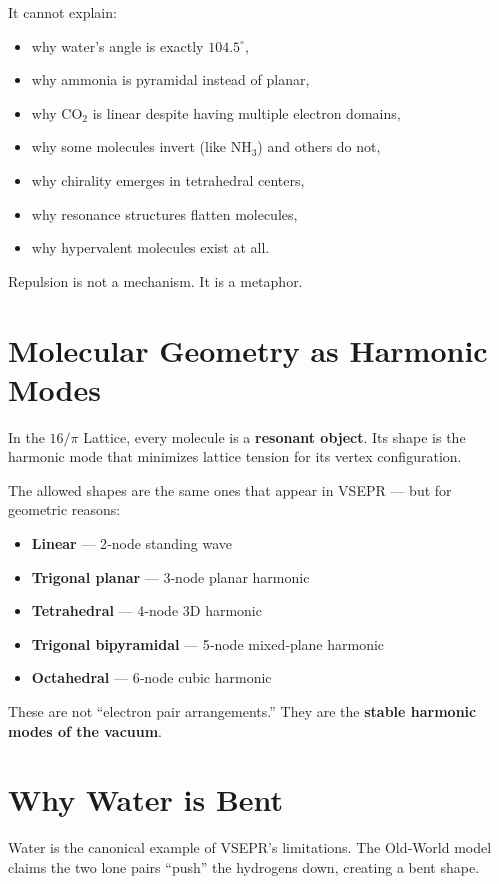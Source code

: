 \documentclass[11pt, letterpaper, openany]{book}
\begin{document}
It cannot explain:

\begin{itemize}
    \item why water’s angle is exactly $104.5^\circ$,
    \item why ammonia is pyramidal instead of planar,
    \item why CO$_2$ is linear despite having multiple electron domains,
    \item why some molecules invert (like NH$_3$) and others do not,
    \item why chirality emerges in tetrahedral centers,
    \item why resonance structures flatten molecules,
    \item why hypervalent molecules exist at all.
\end{itemize}

Repulsion is not a mechanism. It is a metaphor.

\section{Molecular Geometry as Harmonic Modes}

In the $16/\pi$ Lattice, every molecule is a \textbf{resonant object}. Its shape is the harmonic
mode that minimizes lattice tension for its vertex configuration.

The allowed shapes are the same ones that appear in VSEPR — but for geometric reasons:

\begin{itemize}
    \item \textbf{Linear} — 2‑node standing wave
    \item \textbf{Trigonal planar} — 3‑node planar harmonic
    \item \textbf{Tetrahedral} — 4‑node 3D harmonic
    \item \textbf{Trigonal bipyramidal} — 5‑node mixed‑plane harmonic
    \item \textbf{Octahedral} — 6‑node cubic harmonic
\end{itemize}

These are not “electron pair arrangements.”  
They are the \textbf{stable harmonic modes of the vacuum}.

\section{Why Water is Bent}

Water is the canonical example of VSEPR’s limitations. The Old‑World model claims the
two lone pairs “push” the hydrogens down, creating a bent shape.
\end{document}
